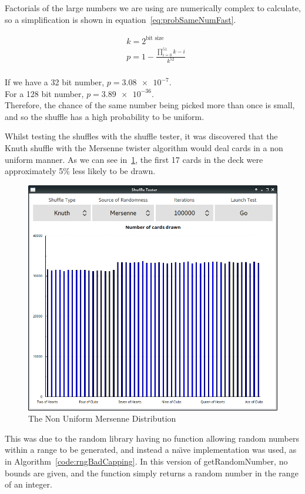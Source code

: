 Factorials of the large numbers we are using are numerically complex to
calculate, so a simplification is shown in equation~\ref{eq:probSameNumFast}.

\begin{equation} \label{eq:probSameNumFast}
\begin{split}
& k = 2^\text{bit size}\\
& p = 1 - \frac{\displaystyle\prod_{i=0}^{51} k - i}{k^{52}}
\end{split}
\end{equation}\\

If we have a 32 bit number, $p = 3.08\num{e-7}$.\\
For a 128 bit number, $p = 3.89\num{e-36}$.\\

Therefore, the chance of the same number being picked more than once is small,
and so the shuffle has a high probability to be uniform.

Whilst testing the shuffles with the shuffle tester, it was discovered that
the Knuth shuffle with the Mersenne twister algorithm would deal cards in a
non uniform manner. As we can see in~\ref{fig:faultymersenne}, the first 17
cards in the deck were approximately 5\% less likely to be drawn.

\begin{figure}[H]
    \centering
    \includegraphics[width=0.8\linewidth]{../images/faultymersenne.png}
    \caption{The Non Uniform Mersenne Distribution}%
    \label{fig:faultymersenne}
\end{figure}

This was due to the random library having no function allowing random numbers
within a range to be generated, and instead a na\"{\i}ve implementation was
used, as in Algorithm~\ref{code:rngBadCapping}. In this version of
getRandomNumber, no bounds are given, and the function simply returns a
random number in the range of an integer.

